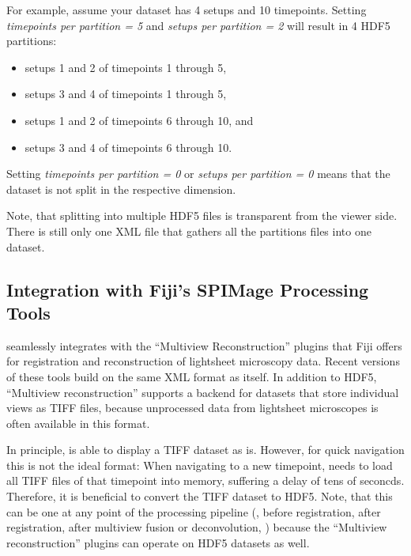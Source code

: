\documentclass{scrartcl}
\begin{document}
For example, assume your dataset has 4 setups and 10 timepoints.
Setting \emph{timepoints per partition = 5} and \emph{setups per partition = 2} will result in 4 HDF5 partitions:
\begin{itemize}
  \item setups 1 and 2 of timepoints 1 through 5,
  \item setups 3 and 4 of timepoints 1 through 5,
  \item setups 1 and 2 of timepoints 6 through 10, and
  \item setups 3 and 4 of timepoints 6 through 10.
\end{itemize}
Setting \emph{timepoints per partition = 0} or \emph{setups per partition = 0} means that the dataset is not split in the respective dimension.

Note, that splitting into multiple HDF5 files is transparent from the viewer side.
There is still only one XML file that gathers all the partitions files into one dataset.

%
\subsection{Integration with Fiji's SPIMage Processing Tools}

\Bdv seamlessly integrates with the ``Multiview Reconstruction'' plugins that Fiji offers for registration and reconstruction of lightsheet microscopy data.
Recent versions of these tools build on the same XML format as \bdv itself.
In addition to HDF5, ``Multiview reconstruction'' supports a backend for datasets that store individual views as TIFF files,
because unprocessed data from lightsheet microscopes is often available in this format.

In principle, \bdv is able to display a TIFF dataset as is.
However, for quick navigation this is not the ideal format:
When navigating to a new timepoint, \bdv needs to load all TIFF files of that timepoint into memory, suffering a delay of tens of seconcds.
Therefore, it is beneficial to convert the TIFF dataset to HDF5.
Note, that this can be one at any point of the processing pipeline (\ie, before registration, after registration, after multiview fusion or deconvolution, \etc)
because the ``Multiview reconstruction'' plugins can operate on HDF5 datasets as well.
\end{document}

